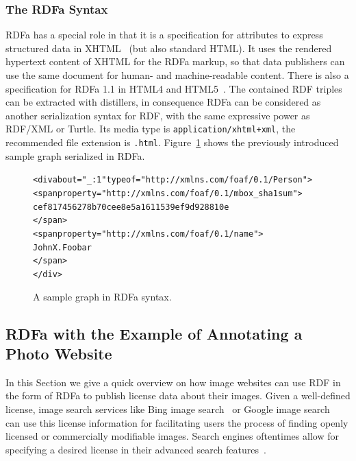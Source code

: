 \documentclass[12pt]{article}
\newenvironment{code}[1]
{\begin{lrbox}{\inverbatim}\begin{minipage}{13.5cm}\begin{alltt}{#1}}
{\end{alltt}\end{minipage}\end{lrbox}\colorbox{lightgray}{\usebox{\inverbatim}}}
\begin{document}
\subsubsection{The RDFa Syntax}
RDFa has a special role in that it is a specification for attributes to express structured data in XHTML~\cite{ben_adida_rdfa_2008} (but also standard HTML). It uses the rendered hypertext content of XHTML for the RDFa markup, so that data publishers can use the same document for human- and machine-readable content. There is also a specification for RDFa 1.1 in HTML4 and HTML5~\cite{rdfa:html}. The contained RDF triples can be extracted with distillers, in consequence RDFa can be considered as another serialization syntax for RDF, with the same expressive power as RDF/XML or Turtle. Its media type is \texttt{application/xhtml+xml}, the recommended file extension is \texttt{.html}. Figure~\ref{code:rdfa-syntax} shows the previously introduced sample graph serialized in RDFa.

\begin{figure}[htbp!]
\begin{center}
{\footnotesize
\begin{code}
<div about="_:1" typeof="http://xmlns.com/foaf/0.1/Person">           
  <span property="http://xmlns.com/foaf/0.1/mbox_sha1sum">
    cef817456278b70cee8e5a1611539ef9d928810e
  </span> 
  <span property="http://xmlns.com/foaf/0.1/name">
    John X. Foobar
  </span>
</div> 
\end{code}}
  \caption{A sample graph in RDFa syntax.}
  \label{code:rdfa-syntax}
  \end{center}  
\end{figure}

\subsection{RDFa with the Example of Annotating a Photo Website}
In this Section we give a quick overview on how image websites can use RDF in the form of RDFa to publish license data about their images. Given a well-defined license, image search services like Bing image search~\cite{bingimg} or Google image search~\cite{googleimg} can use this license information for facilitating users the process of finding openly licensed or commercially modifiable images. Search engines oftentimes allow for specifying a desired license in their advanced search features~\cite{googleadvancedimg}.
\end{document}
